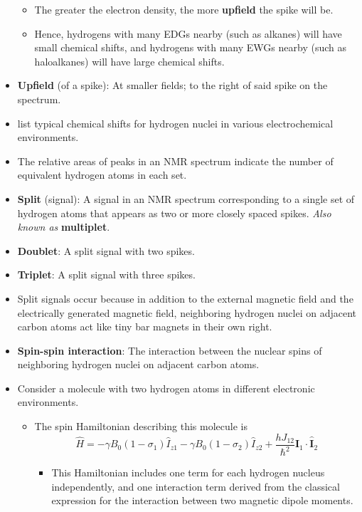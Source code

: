 \documentclass[../notes.tex]{subfiles}
\begin{document}
\begin{itemize}
    \begin{itemize}
        \item The greater the electron density, the more \textbf{upfield} the spike will be.
        \item Hence, hydrogens with many EDGs nearby (such as alkanes) will have small chemical shifts, and hydrogens with many EWGs nearby (such as haloalkanes) will have large chemical shifts.
    \end{itemize}
    \item \textbf{Upfield} (of a spike): At smaller fields; to the right of said spike on the spectrum.
    \item \textcite{bib:McQuarrieSimon} list typical chemical shifts for hydrogen nuclei in various electrochemical environments.
    \item The relative areas of peaks in an NMR spectrum indicate the number of equivalent hydrogen atoms in each set.
    \item \textbf{Split} (signal): A signal in an NMR spectrum corresponding to a single set of hydrogen atoms that appears as two or more closely spaced spikes. \emph{Also known as} \textbf{multiplet}.
    \item \textbf{Doublet}: A split signal with two spikes.
    \item \textbf{Triplet}: A split signal with three spikes.
    \item Split signals occur because in addition to the external magnetic field and the electrically generated magnetic field, neighboring hydrogen nuclei on adjacent carbon atoms act like tiny bar magnets in their own right.
    \item \textbf{Spin-spin interaction}: The interaction between the nuclear spins of neighboring hydrogen nuclei on adjacent carbon atoms.
    \item Consider a molecule with two hydrogen atoms in different electronic environments.
    \begin{itemize}
        \item The spin Hamiltonian describing this molecule is
        \begin{equation*}
            \hat{H} = -\gamma B_0(1-\sigma_1)\hat{I}_{z1}-\gamma B_0(1-\sigma_2)\hat{I}_{z2}+\frac{hJ_{12}}{\hbar^2}\hat{\mathbf{I}}_1\cdot\hat{\mathbf{I}}_2
        \end{equation*}
        \begin{itemize}
            \item This Hamiltonian includes one term for each hydrogen nucleus independently, and one interaction term derived from the classical expression for the interaction between two magnetic dipole moments.

\end{itemize}
\end{itemize}
\end{itemize}
\end{document}
